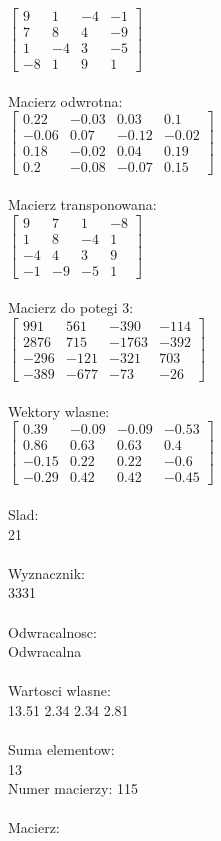 \documentclass[a4paper,12pt]{article}
\begin{document}
$\begin{bmatrix} 9&1&-4&-1\\7&8&4&-9\\1&-4&3&-5\\-8&1&9&1 \end{bmatrix}$
\\
\\
Macierz odwrotna:\\

$\begin{bmatrix} 0.22&-0.03&0.03&0.1\\-0.06&0.07&-0.12&-0.02\\0.18&-0.02&0.04&0.19\\0.2&-0.08&-0.07&0.15 \end{bmatrix}$
\\
\\
Macierz transponowana:\\

$\begin{bmatrix} 9&7&1&-8\\1&8&-4&1\\-4&4&3&9\\-1&-9&-5&1 \end{bmatrix}$
\\
\\
Macierz do potegi 3:\\

$\begin{bmatrix} 991&561&-390&-114\\2876&715&-1763&-392\\-296&-121&-321&703\\-389&-677&-73&-26 \end{bmatrix}$
\\
\\
Wektory wlasne:\\

$\begin{bmatrix} 0.39&-0.09&-0.09&-0.53\\0.86&0.63&0.63&0.4\\-0.15&0.22&0.22&-0.6\\-0.29&0.42&0.42&-0.45 \end{bmatrix}$
\\
\\
Slad:\\
21
\\
\\
Wyznacznik:\\
3331
\\
\\
Odwracalnosc:\\
Odwracalna
\\
\\
Wartosci wlasne:\\
13.51 2.34 2.34 2.81
\\
\\
Suma elementow:\\
13
\\
\newpage
Numer macierzy:
115
\\
\\
Macierz:\\
\end{document}
